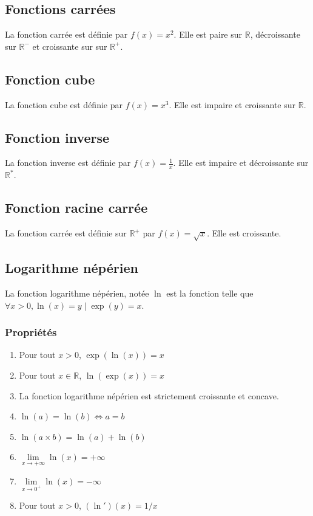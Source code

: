 \documentclass{article}
\begin{document}
\subsection{Fonctions carrées}
La fonction carrée est définie par $f(x) = x^2$. Elle est paire sur $\mathbb{R}$, décroissante sur $\mathbb{R^-}$ et croissante sur sur $\mathbb{R^+}$.


\subsection{Fonction cube}
La fonction cube est définie par $f(x) = x^3$. Elle est impaire et croissante sur $\mathbb{R}$.


\subsection{Fonction inverse}
La fonction inverse est définie par $f(x) = \frac{1}{x}$. Elle est impaire et décroissante sur $\mathbb{R^*}$.


\subsection{Fonction racine carrée}
La fonction carrée est définie sur $\mathbb{R^+}$ par $f(x) = \sqrt{x}$. Elle est croissante.

\subsection{Logarithme népérien}
La fonction logarithme népérien, notée $\ln$ est la fonction telle que $\forall x > 0, \ln(x) = y \mid \exp(y) = x$.
\subsubsection{Propriétés}
\begin{enumerate}
	\item Pour tout $x>0$,  $\exp(\ln(x)) = x$
	\item Pour tout $x \in \mathbb{R}$, $\ln(\exp(x)) = x$
	\item La fonction logarithme népérien est strictement croissante et concave.
	\item $\ln(a) = \ln(b) \Leftrightarrow a=b$
	\item $\ln(a\times b) = \ln(a) + \ln(b)$
	\item $\lim \limits_{x \rightarrow +\infty} \ln(x) = +\infty$
	\item $\lim \limits_{x \rightarrow 0^+}\ln(x) = -\infty$
	\item Pour tout $x>0$, $(\ln ')(x) = 1/x$
\end{enumerate}
\end{document}
